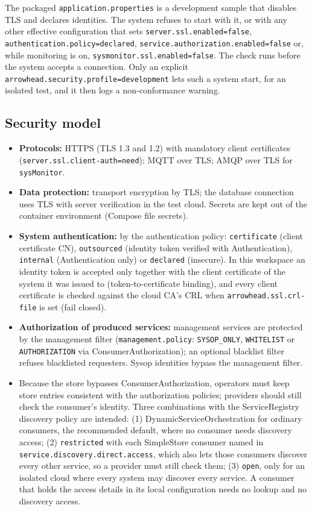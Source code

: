 \documentclass[a4paper]{arrowhead}
\begin{document}
The packaged \texttt{application.properties} is a development sample that disables TLS and declares identities. The system refuses to start with it, or with any other effective configuration that sets \texttt{server.ssl.enabled=false}, \texttt{authentication.policy=declared}, \texttt{service.authorization.enabled=false} or, while monitoring is on, \texttt{sysmonitor.ssl.enabled=false}. The check runs before the system accepts a connection. Only an explicit \texttt{arrowhead.security.profile=development} lets such a system start, for an isolated test, and it then logs a non-conformance warning.

\subsection{Security model}

\begin{itemize}
  \item \textbf{Protocols:} HTTPS (TLS 1.3 and 1.2) with mandatory client certificates (\texttt{server.ssl.client-auth=need}); MQTT over TLS; AMQP over TLS for \texttt{sysMonitor}.
  \item \textbf{Data protection:} transport encryption by TLS; the database connection uses TLS with server verification in the test cloud. Secrets are kept out of the container environment (Compose file secrets).
  \item \textbf{System authentication:} by the authentication policy: \texttt{certificate} (client certificate CN), \texttt{outsourced} (identity token verified with Authentication), \texttt{internal} (Authentication only) or \texttt{declared} (insecure). In this workspace an identity token is accepted only together with the client certificate of the system it was issued to (token-to-certificate binding), and every client certificate is checked against the cloud CA's CRL when \texttt{arrowhead.ssl.crl-file} is set (fail closed).
  \item \textbf{Authorization of produced services:} management services are protected by the management filter (\texttt{management.policy}: \texttt{SYSOP\_ONLY}, \texttt{WHITELIST} or \texttt{AUTHORIZATION} via ConsumerAuthorization); an optional blacklist filter refuses blacklisted requesters. Sysop identities bypass the management filter.
  \item Because the store bypasses Consumer\allowbreak{}Authorization, operators must keep store entries consistent with the authorization policies; providers should still check the consumer's identity. Three combinations with the ServiceRegistry discovery policy are intended: (1) Dynamic\allowbreak{}Service\allowbreak{}Orchestration for ordinary consumers, the recommended default, where no consumer needs discovery access; (2) \texttt{restricted} with each SimpleStore consumer named in \texttt{service.\allowbreak{}discovery.\allowbreak{}direct.\allowbreak{}access}, which also lets those consumers discover every other service, so a provider must still check them; (3) \texttt{open}, only for an isolated cloud where every system may discover every service. A consumer that holds the access details in its local configuration needs no lookup and no discovery access.
\end{itemize}
\end{document}
